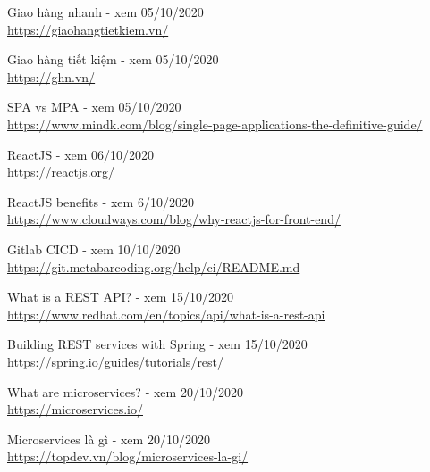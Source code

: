 \documentclass[12pt,a4paper,oneside]{book}
\begin{document}
	\frontmatter
	
	
	

	\tableofcontents
	\listoffigures
	\newpage
	
	\mainmatter
	
	
	
    
    
    
    
    
    
    \begin{thebibliography}{80}
        
         Giao hàng nhanh - xem 05/10/2020\\
        \url{https://giaohangtietkiem.vn/}
        
         Giao hàng tiết kiệm - xem 05/10/2020\\
        \url{https://ghn.vn/}
    
         SPA vs MPA - xem 05/10/2020\\
        \url{https://www.mindk.com/blog/single-page-applications-the-definitive-guide/}
        
         ReactJS - xem 06/10/2020\\
        \url{https://reactjs.org/}
    
         ReactJS benefits - xem 6/10/2020\\
        \url{https://www.cloudways.com/blog/why-reactjs-for-front-end/}
    
         Gitlab CICD - xem 10/10/2020\\
        \url{https://git.metabarcoding.org/help/ci/README.md}    
        
         What is a REST API? - xem 15/10/2020\\
        \url{https://www.redhat.com/en/topics/api/what-is-a-rest-api} 
        
        \bibitem{} Building REST services with Spring - xem 15/10/2020\\
        \url{https://spring.io/guides/tutorials/rest/} 
        
         \bibitem{} What are microservices? - xem 20/10/2020\\
        \url{https://microservices.io/} 
        
        \bibitem{} Microservices là gì - xem 20/10/2020\\
        \url{https://topdev.vn/blog/microservices-la-gi/} 
        

\end{thebibliography}
\end{document}
